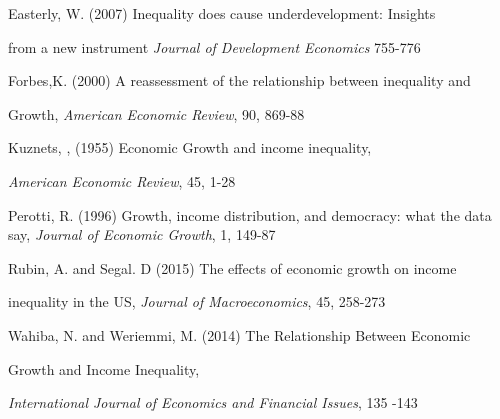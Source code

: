 \documentclass{article}
\begin{document}
\vspace{1mm}

Easterly, W. (2007) Inequality does cause underdevelopment: Insights

\vspace{1mm}

\quad\quad from a new instrument \emph{Journal of Development Economics} 755-776

Forbes,K. (2000) A reassessment of the relationship between inequality and 

\vspace{1mm}

\quad\quad  Growth, \emph{American Economic Review}, 90, 869-88

\vspace{1mm}

Kuznets, , (1955) Economic Growth and income inequality,
\vspace{1mm}

\quad\quad  \emph{American Economic Review}, 45, 1-28

\vspace{1mm}

Perotti, R. (1996) Growth, income distribution, and democracy: what the data  
\vspace{1mm}
\quad\quad say, \emph{Journal of Economic Growth}, 1, 149-87

\vspace{1mm}

Rubin, A. and Segal. D (2015) The effects of economic growth on income
\vspace{1mm}

\quad\quad inequality in the US, \emph{Journal of Macroeconomics}, 45, 258-273

\vspace{1mm}

Wahiba, N. and Weriemmi, M. (2014) The Relationship Between Economic 

\vspace{1mm}

\quad\quad Growth and Income Inequality, 
\vspace{1mm}

\quad \quad \emph{International Journal of Economics and Financial Issues}, 135 -143 
\end{document}
